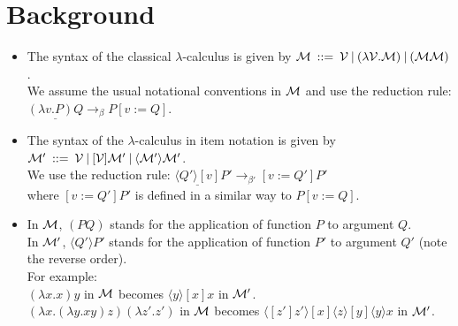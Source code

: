 \documentclass[11pt]{article}
\newcommand{\la}{\lambda}
\newcommand{\be}{\beta}
\newcommand \cM {\cal M}
\begin{document}
\date{}

\maketitle

\section*{Background}
\begin{itemize}
\item
The syntax of the classical $\lambda$-calculus is given by
$\cM  \: ::=  \:  {\cal V} \:|\: ( \la{{\cal V}}.{\cM}) \:|\: ( \cM \cM)$.\\
We assume the usual notational conventions in $\cM$ and use 
the reduction rule: \\$\underline{(\la v. P)Q} \rightarrow_\be P[v:=Q]$.
\item
The syntax of the  $\lambda$-calculus in item notation is given by
$\cM'  \: ::=  \:  {\cal V} \:|\: [{\cal V}]\cM' \:|\: \langle\cM'\rangle\cM'$.\\
We use the reduction rule: 
$ \underline{\langle Q'\rangle[v]}P' \rightarrow_{\be'} [v:=Q']P'$\\
where $[v:=Q']P'$ is defined in a similar way to $P[v:=Q]$.
\item
 In $\cM$, $(PQ)$ stands for the application of function $P$ to argument $Q$.\\
 In $\cM'$, $\langle Q'\rangle P'$ stands for the application of function $P'$ to argument $Q'$ (note the reverse order).\\For example: \\
 $(\la x.x)y$ in ${\cal M}$ becomes $ \langle y \rangle[x]x$ in ${\cal M}'$.\\
 $(\la x.(\la y.xy)z)(\la z'.z')$ in ${\cal M}$ becomes
 $ \langle[z']z' \rangle[x] \langle z \rangle[y] \langle y \rangle  x$ in ${\cal M}'$.


\end{itemize}
\end{document}
